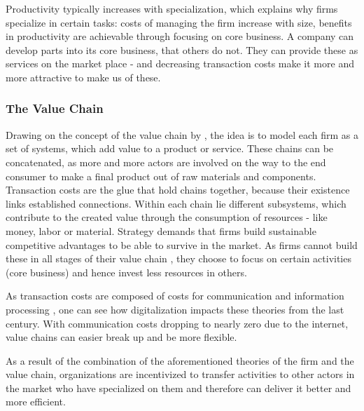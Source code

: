 		Productivity typically increases with specialization, which explains why firms specialize in certain tasks: costs of managing the firm increase with size, benefits in productivity are achievable through focusing on core business.
		A company can develop parts into its core business, that others do not. They can provide these as services on the market place - and decreasing transaction costs make it more and more attractive to make us of these. 
		
		\subsubsection{The Value Chain}
		Drawing on the concept of the value chain by \cite{porter1985}, the idea is to model each firm as a set of systems, which add value to a product or service. These chains can be concatenated, as more and more actors are involved on the way to the end consumer to make a final product out of raw materials and components. Transaction costs are the glue that hold chains together, because their existence links established connections.  Within each chain lie different subsystems, which contribute to the created value through the consumption of resources - like money, labor or material. Strategy demands that firms build sustainable competitive advantages to be able to survive in the market. As firms cannot build these in all stages of their value chain \citep{Ramachandran2004}, they choose to focus on certain activities (core business) and hence invest less resources in others. 
		
		As transaction costs are composed of costs for communication and information processing \citep{evansted}, one can see how digitalization impacts these theories from the last century. With communication costs dropping to nearly zero due to the internet, value chains can easier break up and be more flexible. 
		
		As a result of the combination of the aforementioned theories of the firm and the value chain, organizations are incentivized to transfer activities to other actors in the market who have specialized on them and therefore can deliver it better and more efficient.
		
		
